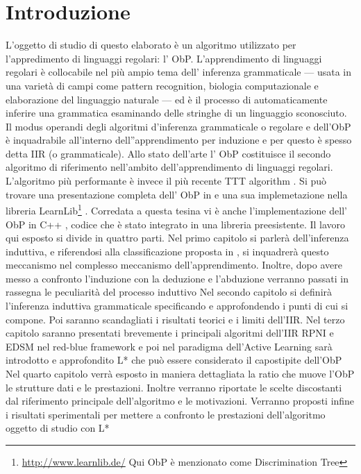 

\chapter*{Introduzione} %
\label{cap:intro}

 
L'oggetto di studio di questo elaborato è un algoritmo utilizzato per l'appredimento di linguaggi regolari: l' \ac{ObP}.
L'apprendimento di linguaggi regolari è collocabile nel più ampio tema dell' inferenza grammaticale --- usata in una varietà di campi come pattern recognition, biologia computazionale e elaborazione del linguaggio naturale --- ed è il processo di automaticamente inferire una grammatica esaminando delle stringhe di un linguaggio sconosciuto.
Il modus operandi degli algoritmi d'inferenza grammaticale o regolare e dell'\ac{ObP} è inquadrabile all'interno dell''apprendimento per induzione e per questo è spesso detta \ac{IIR}  (o grammaticale).
Allo stato dell'arte l' \ac{ObP} costituisce il secondo algoritmo di riferimento nell'ambito dell'apprendimento di linguaggi regolari.  L'algoritmo più performante è invece il più recente TTT algorithm \cite{SteffenTTT14}.
Si può trovare una presentazione completa dell' \ac{ObP}  in \cite{Howar12} e una sua implemetazione nella libreria LearnLib\footnote{\href{http://www.learnlib.de/}{http://www.learnlib.de/} Qui \ac{ObP} è menzionato come Discrimination Tree} . Corredata a questa tesina vi è anche l'implementazione dell' \ac{ObP} in C++ , codice che è stato integrato in una libreria preesistente.
Il lavoro qui esposto si divide in quattro parti. Nel primo capitolo si parlerà dell'inferenza induttiva, e riferendosi alla classificazione proposta in \cite{Mic86a}, si inquadrerà questo meccanismo nel complesso meccanismo dell'apprendimento.
Inoltre, dopo avere messo a confronto l'induzione con la deduzione e l'abduzione verranno passati in rassegna le peculiarità del processo induttivo
Nel secondo capitolo si definirà l'inferenza induttiva grammaticale specificando e approfondendo i punti di cui si compone. Poi saranno scandagliati i risultati teorici e i limiti dell'\ac{IIR}.
Nel terzo capitolo saranno presentati brevemente i principali algoritmi dell'\ac{IIR} RPNI e EDSM nel red-blue framework e poi nel paradigma dell'Active Learning sarà introdotto e approfondito L* \cite{Angluin87} che può essere considerato il capostipite dell'\ac{ObP}
Nel quarto capitolo verrà esposto in maniera dettagliata la ratio che muove l'\ac{ObP} le strutture dati e le prestazioni. Inoltre verranno riportate le scelte discostanti dal riferimento principale dell'algoritmo \cite{Howar12} e le motivazioni. Verranno proposti infine i risultati sperimentali per mettere a confronto le prestazioni dell'algoritmo oggetto di studio con L*


